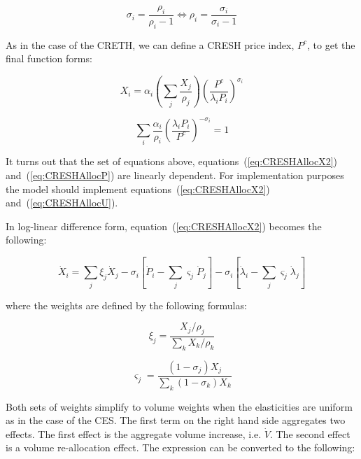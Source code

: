 \begin{displaymath}
\sigma_i=\frac{\rho_i}{\rho_i-1} \iff \rho_i=\frac{\sigma_i}{\sigma_i-1}
\end{displaymath}

As in the case of the CRETH, we can define a CRESH price index, $P^c$,
to get the final function forms:

\begin{equation}
\label{eq:CRESHAllocX2}
X_i = \alpha_i \left(\sum_j{\frac{X_j}{\rho_j}} \right)
\left( \frac{P^c}{\lambda_i P_i}\right)^{\sigma_i}
\end{equation}

\begin{equation}
\label{eq:CRESHAllocP}
\sum_i{\frac{\alpha_i}{\rho_i} \left( \frac{\lambda_i P_i}{P^c}\right)^{-\sigma_i}} = 1
\end{equation}

It turns out that the set of equations above, equations~(\ref{eq:CRESHAllocX2}) and~(\ref{eq:CRESHAllocP}) are
linearly dependent. For implementation purposes the model should
implement equations~(\ref{eq:CRESHAllocX2}) and~(\ref{eq:CRESHAllocU}).

In log-linear difference form, equation~(\ref{eq:CRESHAllocX2}) becomes the following:

\begin{equation}
\label{eq:CRESHAllocXlin}
\dot X_i = \sum_j{\xi_j \dot X_j}
- \sigma_i\left[ \dot P_i - \sum_j{\varsigma_j} \dot P_j\right]
- \sigma_i\left[ \dot \lambda_i - \sum_j{\varsigma_j} \dot \lambda_j \right]
\end{equation}

\noindent where the weights are defined by the following formulas:

\begin{displaymath}
\xi_j = \frac{X_j/\rho_j}{\sum_k{X_k}/\rho_k}
\end{displaymath}

\begin{displaymath}
\varsigma_j = \frac{(1-\sigma_j)X_j}{\sum_k{(1-\sigma_k)X_k}}
\end{displaymath}

\noindent Both sets of weights simplify to volume weights when the elasticities are uniform as in the case of the CES. The first term on the right hand side
aggregates two effects. The first effect is the aggregate volume increase,
i.e. $\dot V$. The second effect is a volume re-allocation effect. The expression can be converted to the following:

